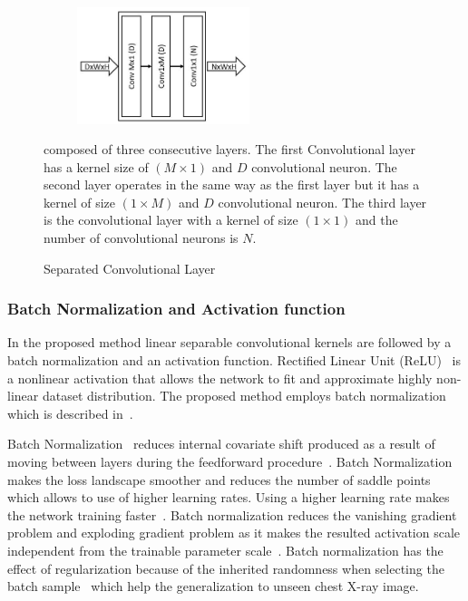 \begin{figure}
    \begin{center}
    \includegraphics[height=34mm,width=7.0cm]{Figures/fig3.jpg}
    \caption{Separated Convolutional Layer}{ composed of three consecutive layers. The first Convolutional layer has a kernel size of $(M\times1)$ and $D$  convolutional neuron. The second layer operates in the same way as the first layer but it has a kernel of size $(1\times M)$ and $D$ convolutional neuron. The third layer is the convolutional layer with a kernel of size $(1\times1)$ and the number of convolutional neurons is $N$.}
    \label{fig3}
    \end{center}
    \end{figure}

\subsubsection{ Batch Normalization and  Activation function}

In the proposed method linear separable convolutional kernels are followed by a batch normalization and an activation function. Rectified Linear Unit (ReLU)~\cite{he2015delving} is a nonlinear activation that allows the network to fit and approximate highly non-linear dataset distribution. The proposed method employs batch normalization which is described in~\cite{ioffe2015batch}. 

Batch Normalization~\cite{ioffe2015batch} reduces internal covariate shift produced as a result of moving between layers during the feedforward procedure~\cite{ioffe2015batch}. Batch Normalization makes the loss landscape smoother and reduces the number of saddle points~\cite{santurkar2018does} which allows to use of higher learning rates. Using a higher learning rate makes the network training  faster~\cite{ioffe2015batch}. Batch normalization reduces the vanishing gradient problem and exploding gradient problem as it makes the resulted activation scale independent from the trainable parameter scale~\cite{ioffe2015batch}. Batch normalization has the effect of regularization because of the inherited randomness when selecting the batch sample~\cite{ioffe2015batch} which help the generalization to unseen chest X-ray image.

